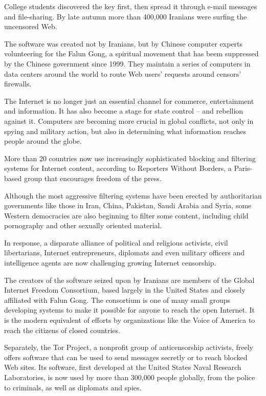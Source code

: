 \documentclass[12pt,a4paper,onecolumn]{article}
\begin{document}
College students discovered the key first, then spread it through e-mail messages and file-sharing.
By late autumn more than 400,000 Iranians were surfing the uncensored Web.

The software was created not by Iranians, but by Chinese computer experts volunteering for the Falun
Gong, a spiritual movement that has beem suppressed by the Chinese government since 1999. They
maintain a series of computers in data centers around the world to route Web users' requests around
censors' firewalls.

The Internet is no longer just an essential channel for commerce, entertainment and information. It
has also become a stage for state control -- and rebellion against it. Computers are becoming more
crucial in global conflicts, not only in spying and military action, but also in determining what
information reaches people around the globe.

More than 20 countries now use increasingly sophisticated blocking and filtering systems for
Internet content, according to Reporters Without Borders, a Paris-based group that encourages
freedom of the press.

Although the most aggressive filtering systems have been erected by authoritarian governments like
those in Iran, China, Pakistan, Saudi Arabia and Syria, some Western democracies are also beginning
to filter some content, including child pornography and other sexually oriented material.

In response, a disparate alliance of political and religious activists, civil libertarians, Internet
entrepreneurs, diplomats and even military officers and intelligence agents are now challenging
growing Internet censorship.

The creators of the software seized upon by Iranians are members of the Global Internet Freedom
Consortium, based largely in the United States and closely affiliated with Falun Gong. The
consortium is one of many small groups developing systems to make it possible for anyone to reach
the open Internet. It is the modern equivalent of efforts by organizations like the Voice of America
to reach the citizens of closed countries.

Separately, the Tor Project, a nonprofit group of anticensorship activists, freely offers software
that can be used to send messages secretly or to reach blocked Web sites. Its software, first
developed at the United States Naval Research Laboratories, is now used by more than 300,000 people
globally, from the police to criminals, as well as diplomats and spies.
\end{document}
